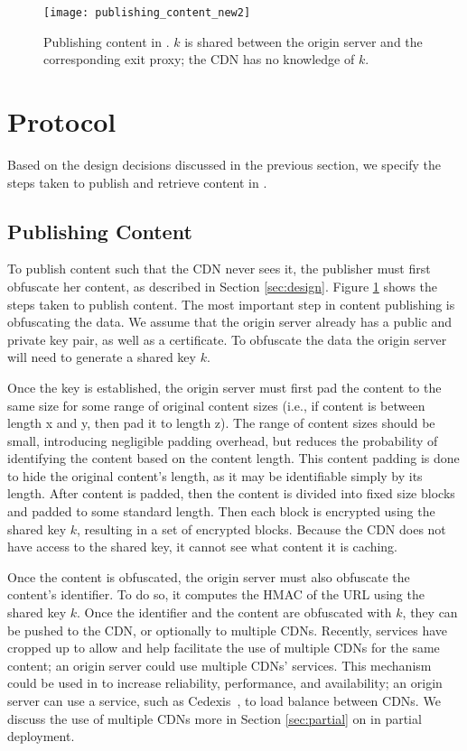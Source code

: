 \begin{figure}[t!]
\centering
\texttt{[image: publishing\_content\_new2]}
\caption{Publishing content in \system{}.  $k$ is shared between the 
origin server and the corresponding exit proxy; the CDN has no knowledge of $k$.}
\label{fig:publishing}
\end{figure}

\section{\system{} Protocol}
\label{sec:protocol}
Based on the design decisions discussed in the previous section, we specify the 
steps taken to publish and retrieve content in \system{}.

\subsection{Publishing Content}
\label{sec:publish_protocol}
To publish content such that the CDN never sees it, the publisher 
must first obfuscate her content, as described in Section \ref{sec:design}. 
Figure \ref{fig:publishing} shows the steps taken to publish content. The most important step in content publishing is obfuscating the data.  We assume that the origin server already has a public and private key pair, as well as a certificate.  To obfuscate the data the origin server will need to generate a shared key $k$. 

Once the key is established, the origin server must first pad the content to the same size for some 
range of original content sizes (i.e., if content is between length x and y, then pad it to length 
z).  The range of content sizes should be small, introducing negligible padding
overhead, but
reduces the probability of identifying the content based on the content length.  This content padding 
is done to hide the original content's length, as it may be identifiable simply by its length.  After 
content is padded, then the content is divided into fixed size blocks and padded to 
some standard length.  Then each block is encrypted using the shared key $k$, 
resulting in a set of encrypted blocks. Because the CDN does not have access to the shared key, 
it cannot see what content it is caching.  

Once the content is obfuscated, the origin server must also obfuscate the content's identifier.  To do so, 
it computes the HMAC of the URL using the shared key $k$.
Once the identifier and the content are obfuscated with $k$, they can be pushed to the CDN, or optionally to multiple 
CDNs.  Recently, services have cropped up to allow and help facilitate the use of multiple CDNs for the same content; an 
origin server could use multiple CDNs' services.  This mechanism could be used in \system{} to increase reliability, 
performance, and availability; an origin server can use a service, such as Cedexis~\cite{cedexis}, to load balance between 
CDNs.  We discuss the use of multiple CDNs more in Section \ref{sec:partial} on \system{} in 
partial deployment.

